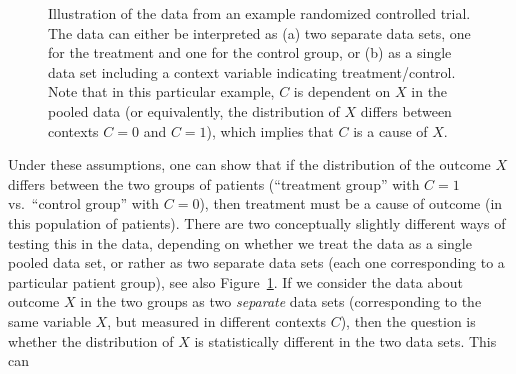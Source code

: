 \documentclass[twoside,11pt]{article}
\begin{document}
\begin{figure}
  \caption{Illustration of the data from an example randomized controlled trial. The data can either be interpreted
  as (a) two separate data sets, one for the treatment and one for the control group, or (b) 
  as a single data set including a context variable indicating treatment/control. Note that in this
  particular example, $C$ is dependent on $X$ in the pooled data (or equivalently, the distribution of $X$
  differs between contexts $C=0$ and $C=1$), which implies that $C$ is a cause of $X$.\label{fig:RCT_example}}
\end{figure}
Under these assumptions, one can show that
if the distribution of the outcome $X$ differs between the two groups of
patients (``treatment group'' with $C=1$ vs.\ ``control group'' with $C=0$), 
then treatment must be a cause of outcome (in this population of patients). 
There are two conceptually slightly different ways of testing this in the data, depending on whether
we treat the data as a single pooled data set, or rather as two separate data sets (each one corresponding 
to a particular patient group), see also Figure~\ref{fig:RCT_example}.
If we consider the data about outcome $X$
in the two groups as two \emph{separate} data sets (corresponding to the same
variable $X$, but measured in different contexts $C$), then the question is whether the
distribution of $X$ is statistically different in the two data sets. This can 
\end{document}

